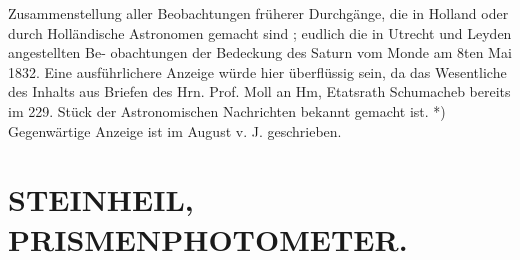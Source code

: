 \documentclass[12pt,a4paper]{article}
\begin{document}
{{{{{{{{Zusammenstellung  aller  Beobachtungen  früherer  Durchgänge,  die  in  Holland oder  durch  Holländische  Astronomen  gemacht  sind ;  eudlich  die  in  Utrecht  und  Leyden  angestellten  Be- obachtungen der  Bedeckung  des  Saturn  vom  Monde  am  8ten  Mai  1832.  Eine  ausführlichere  Anzeige würde  hier  überflüssig  sein,  da  das  Wesentliche  des  Inhalts  aus  Briefen  des  Hrn.  Prof.  Moll  an  Hm, Etatsrath  Schumacheb  bereits  im  229.  Stück  der  Astronomischen  Nachrichten  bekannt  gemacht  ist. *)  Gegenwärtige  Anzeige  ist  im  August  v.  J.  geschrieben.


\section*{STEINHEIL,    PRISMENPHOTOMETER.}

}}}}}}}}
\end{document}

